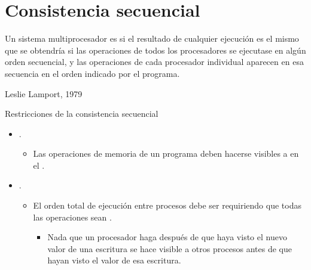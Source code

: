 \section{Consistencia secuencial}

\begin{frame}[t]
\makebox[\textwidth][c]{}
\begin{footnotesize}
Un sistema multiprocesador es  si el resultado de
cualquier ejecución es el mismo que se obtendría si las operaciones de todos
los procesadores se ejecutase en algún orden secuencial, y las operaciones de
cada procesador individual aparecen en esa secuencia en el orden indicado por
el programa.

\begin{flushright}
Leslie Lamport, 1979
\end{flushright}
\end{footnotesize}
\end{frame}

\begin{frame}[t]{Restricciones de la consistencia secuencial}
\begin{itemize}
  \item {}.
    \begin{itemize}
      \item Las operaciones de memoria de un programa deben 
            hacerse visibles a  en el 
            .
    \end{itemize}

  \item {}.
    \begin{itemize}
      \item El orden total de ejecución entre procesos debe ser 
             requiriendo que todas las 
             operaciones sean .
        \begin{itemize}
          \item Nada que un procesador haga 
                después de que haya visto el nuevo valor de una escritura 
                se hace visible a otros procesos antes de que 
                hayan visto el valor de esa escritura.
        \end{itemize}
    \end{itemize}
\end{itemize}
\end{frame}

